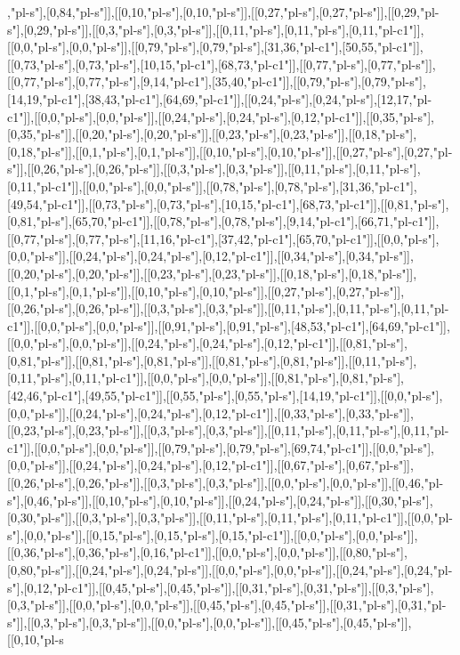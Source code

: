 ,"pl-s"],[0,84,"pl-s"]],[[0,10,"pl-s"],[0,10,"pl-s"]],[[0,27,"pl-s"],[0,27,"pl-s"]],[[0,29,"pl-s"],[0,29,"pl-s"]],[[0,3,"pl-s"],[0,3,"pl-s"]],[[0,11,"pl-s"],[0,11,"pl-s"],[0,11,"pl-c1"]],[[0,0,"pl-s"],[0,0,"pl-s"]],[[0,79,"pl-s"],[0,79,"pl-s"],[31,36,"pl-c1"],[50,55,"pl-c1"]],[[0,73,"pl-s"],[0,73,"pl-s"],[10,15,"pl-c1"],[68,73,"pl-c1"]],[[0,77,"pl-s"],[0,77,"pl-s"]],[[0,77,"pl-s"],[0,77,"pl-s"],[9,14,"pl-c1"],[35,40,"pl-c1"]],[[0,79,"pl-s"],[0,79,"pl-s"],[14,19,"pl-c1"],[38,43,"pl-c1"],[64,69,"pl-c1"]],[[0,24,"pl-s"],[0,24,"pl-s"],[12,17,"pl-c1"]],[[0,0,"pl-s"],[0,0,"pl-s"]],[[0,24,"pl-s"],[0,24,"pl-s"],[0,12,"pl-c1"]],[[0,35,"pl-s"],[0,35,"pl-s"]],[[0,20,"pl-s"],[0,20,"pl-s"]],[[0,23,"pl-s"],[0,23,"pl-s"]],[[0,18,"pl-s"],[0,18,"pl-s"]],[[0,1,"pl-s"],[0,1,"pl-s"]],[[0,10,"pl-s"],[0,10,"pl-s"]],[[0,27,"pl-s"],[0,27,"pl-s"]],[[0,26,"pl-s"],[0,26,"pl-s"]],[[0,3,"pl-s"],[0,3,"pl-s"]],[[0,11,"pl-s"],[0,11,"pl-s"],[0,11,"pl-c1"]],[[0,0,"pl-s"],[0,0,"pl-s"]],[[0,78,"pl-s"],[0,78,"pl-s"],[31,36,"pl-c1"],[49,54,"pl-c1"]],[[0,73,"pl-s"],[0,73,"pl-s"],[10,15,"pl-c1"],[68,73,"pl-c1"]],[[0,81,"pl-s"],[0,81,"pl-s"],[65,70,"pl-c1"]],[[0,78,"pl-s"],[0,78,"pl-s"],[9,14,"pl-c1"],[66,71,"pl-c1"]],[[0,77,"pl-s"],[0,77,"pl-s"],[11,16,"pl-c1"],[37,42,"pl-c1"],[65,70,"pl-c1"]],[[0,0,"pl-s"],[0,0,"pl-s"]],[[0,24,"pl-s"],[0,24,"pl-s"],[0,12,"pl-c1"]],[[0,34,"pl-s"],[0,34,"pl-s"]],[[0,20,"pl-s"],[0,20,"pl-s"]],[[0,23,"pl-s"],[0,23,"pl-s"]],[[0,18,"pl-s"],[0,18,"pl-s"]],[[0,1,"pl-s"],[0,1,"pl-s"]],[[0,10,"pl-s"],[0,10,"pl-s"]],[[0,27,"pl-s"],[0,27,"pl-s"]],[[0,26,"pl-s"],[0,26,"pl-s"]],[[0,3,"pl-s"],[0,3,"pl-s"]],[[0,11,"pl-s"],[0,11,"pl-s"],[0,11,"pl-c1"]],[[0,0,"pl-s"],[0,0,"pl-s"]],[[0,91,"pl-s"],[0,91,"pl-s"],[48,53,"pl-c1"],[64,69,"pl-c1"]],[[0,0,"pl-s"],[0,0,"pl-s"]],[[0,24,"pl-s"],[0,24,"pl-s"],[0,12,"pl-c1"]],[[0,81,"pl-s"],[0,81,"pl-s"]],[[0,81,"pl-s"],[0,81,"pl-s"]],[[0,81,"pl-s"],[0,81,"pl-s"]],[[0,11,"pl-s"],[0,11,"pl-s"],[0,11,"pl-c1"]],[[0,0,"pl-s"],[0,0,"pl-s"]],[[0,81,"pl-s"],[0,81,"pl-s"],[42,46,"pl-c1"],[49,55,"pl-c1"]],[[0,55,"pl-s"],[0,55,"pl-s"],[14,19,"pl-c1"]],[[0,0,"pl-s"],[0,0,"pl-s"]],[[0,24,"pl-s"],[0,24,"pl-s"],[0,12,"pl-c1"]],[[0,33,"pl-s"],[0,33,"pl-s"]],[[0,23,"pl-s"],[0,23,"pl-s"]],[[0,3,"pl-s"],[0,3,"pl-s"]],[[0,11,"pl-s"],[0,11,"pl-s"],[0,11,"pl-c1"]],[[0,0,"pl-s"],[0,0,"pl-s"]],[[0,79,"pl-s"],[0,79,"pl-s"],[69,74,"pl-c1"]],[[0,0,"pl-s"],[0,0,"pl-s"]],[[0,24,"pl-s"],[0,24,"pl-s"],[0,12,"pl-c1"]],[[0,67,"pl-s"],[0,67,"pl-s"]],[[0,26,"pl-s"],[0,26,"pl-s"]],[[0,3,"pl-s"],[0,3,"pl-s"]],[[0,0,"pl-s"],[0,0,"pl-s"]],[[0,46,"pl-s"],[0,46,"pl-s"]],[[0,10,"pl-s"],[0,10,"pl-s"]],[[0,24,"pl-s"],[0,24,"pl-s"]],[[0,30,"pl-s"],[0,30,"pl-s"]],[[0,3,"pl-s"],[0,3,"pl-s"]],[[0,11,"pl-s"],[0,11,"pl-s"],[0,11,"pl-c1"]],[[0,0,"pl-s"],[0,0,"pl-s"]],[[0,15,"pl-s"],[0,15,"pl-s"],[0,15,"pl-c1"]],[[0,0,"pl-s"],[0,0,"pl-s"]],[[0,36,"pl-s"],[0,36,"pl-s"],[0,16,"pl-c1"]],[[0,0,"pl-s"],[0,0,"pl-s"]],[[0,80,"pl-s"],[0,80,"pl-s"]],[[0,24,"pl-s"],[0,24,"pl-s"]],[[0,0,"pl-s"],[0,0,"pl-s"]],[[0,24,"pl-s"],[0,24,"pl-s"],[0,12,"pl-c1"]],[[0,45,"pl-s"],[0,45,"pl-s"]],[[0,31,"pl-s"],[0,31,"pl-s"]],[[0,3,"pl-s"],[0,3,"pl-s"]],[[0,0,"pl-s"],[0,0,"pl-s"]],[[0,45,"pl-s"],[0,45,"pl-s"]],[[0,31,"pl-s"],[0,31,"pl-s"]],[[0,3,"pl-s"],[0,3,"pl-s"]],[[0,0,"pl-s"],[0,0,"pl-s"]],[[0,45,"pl-s"],[0,45,"pl-s"]],[[0,10,"pl-s